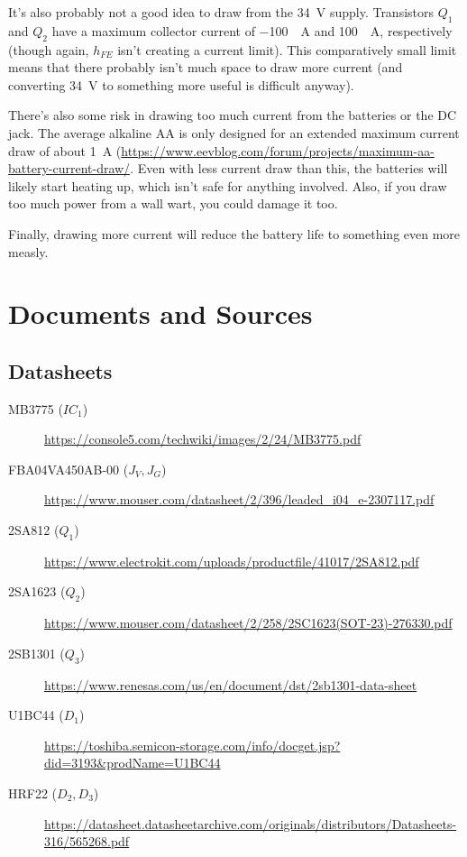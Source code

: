 \documentclass{article}
\newcommand{\model}{\textsf}
\begin{document}
It's also probably not a good idea to draw from the \qty{34}{\volt}
supply. Transistors $Q_1$ and $Q_2$ have a maximum collector current
of \qty{-100}{\milli{}A} and \qty{100}{\milli{}A}, respectively
(though again, $h_{FE}$ isn't creating a current limit). This
comparatively small limit means that there probably isn't much space
to draw more current (and converting \qty{34}{\volt} to something more
useful is difficult anyway).

There's also some risk in drawing too much current from the batteries
or the DC jack. The average alkaline AA is only designed for an
extended maximum current draw of about \qty{1}{A}
(\url{https://www.eevblog.com/forum/projects/maximum-aa-battery-current-draw/}.
Even with less current draw than this, the batteries will likely start
heating up, which isn't safe for anything involved. Also, if you draw
too much power from a wall wart, you could damage it too.

Finally, drawing more current will reduce the battery life to
something even more measly.

\section{Documents and Sources}
\label{sec:documents}
\subsection{Datasheets}
\begin{description}
\item[\model{MB3775} ($IC_1$)]
  \url{https://console5.com/techwiki/images/2/24/MB3775.pdf}
\item[\model{FBA04VA450AB-00} ($J_V,J_G$)]
  \url{https://www.mouser.com/datasheet/2/396/leaded_i04_e-2307117.pdf}
\item[\model{2SA812} ($Q_1$)]
  \url{https://www.electrokit.com/uploads/productfile/41017/2SA812.pdf}
\item[\model{2SA1623} ($Q_2$)]
  \url{https://www.mouser.com/datasheet/2/258/2SC1623(SOT-23)-276330.pdf}
\item[\model{2SB1301} ($Q_3$)]
  \url{https://www.renesas.com/us/en/document/dst/2sb1301-data-sheet}
\item[\model{U1BC44} ($D_1$)]
  \url{https://toshiba.semicon-storage.com/info/docget.jsp?did=3193&prodName=U1BC44}
  
\item[\model{HRF22} ($D_2,D_3$)]
  \url{https://datasheet.datasheetarchive.com/originals/distributors/Datasheets-316/565268.pdf}
\end{description}
\end{document}
